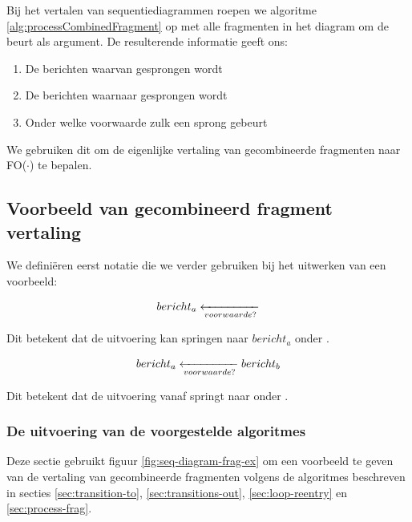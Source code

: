Bij het vertalen van sequentiediagrammen roepen we algoritme \ref{alg:processCombinedFragment} op met alle fragmenten in het diagram om de beurt als argument. De resulterende informatie geeft ons:

\begin{enumerate}
	\item De berichten waarvan gesprongen wordt
	\item De berichten waarnaar gesprongen wordt
	\item Onder welke voorwaarde zulk een sprong gebeurt
\end{enumerate}

We gebruiken dit om de eigenlijke vertaling van gecombineerde fragmenten naar FO($\cdot$) te bepalen.

\subsection{Voorbeeld van gecombineerd fragment vertaling}

We defini\"eren eerst notatie die we verder gebruiken bij het uitwerken van een voorbeeld:

\begin{align*}
	\transitionentry{\fragcond{voorwaarde}}{\fragmessage{$bericht_a$}}
\end{align*}

Dit betekent dat de uitvoering kan springen naar $bericht_a$ onder \textit{}.

\begin{align*}
	\transitionentry[\fragmessage{$bericht_b$}]{\fragcond{voorwaarde}}{\fragmessage{$bericht_a$}}
\end{align*}

Dit betekent dat de uitvoering vanaf  springt naar  onder \textit{}.

\subsubsection{De uitvoering van de voorgestelde algoritmes}

Deze sectie gebruikt figuur \ref{fig:seq-diagram-frag-ex} om een voorbeeld te geven van de vertaling van gecombineerde fragmenten volgens de algoritmes beschreven in secties \ref{sec:transition-to}, \ref{sec:transitions-out}, \ref{sec:loop-reentry} en \ref{sec:process-frag}.

